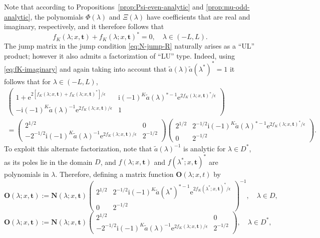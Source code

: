 \documentclass[12pt]{amsart}
\numberwithin{equation}{section}
\newcommand{\ee}{\mathrm{e}}
\newcommand{\ii}{\mathrm{i}}
\newcommand{\SP}{\lambda}
\newcommand{\phaseint}{\Phi}
\newcommand{\tailint}{\Xi}
\begin{document}
Note that according to Propositions~\ref{prop:Psi-even-analytic} and \ref{prop:mu-odd-analytic}, the polynomials $\phaseint(\SP)$ and $\tailint(\SP)$ have coefficients that are real and imaginary, respectively, and it therefore follows that
\begin{equation}
f_K(\SP;x,\mathbf{t})+f_K(\SP;x,\mathbf{t})^*=0,\quad\SP\in (-L,L).
\label{eq:fK-imaginary}
\end{equation}
The jump matrix in the jump condition \eqref{eq:N-jump-R} naturally arises as a ``UL'' product; however it also admits a factorization of ``LU'' type.  Indeed, using \eqref{eq:fK-imaginary} and again taking into account that $\widetilde{a}(\SP)\widetilde{a}(\SP^*)^*=1$ it follows that for $\SP\in (-L,L)$,
\begin{multline}
\begin{pmatrix} 1+\ee^{2[f_K(\SP;x,\mathbf{t})+f_K(\SP;x,\mathbf{t})^*]/\epsilon} & \ii(-1)^K\widetilde{a}(\SP)^{*-1}\ee^{2f_K(\SP;x,\mathbf{t})^*/\epsilon}\\-\ii(-1)^K\widetilde{a}(\SP)^{-1}\ee^{2f_K(\SP;x,\mathbf{t})/\epsilon} & 1\end{pmatrix}\\{}=\begin{pmatrix}2^{1/2} & 0\\-2^{-1/2}\ii(-1)^K\widetilde{a}(\SP)^{-1}\ee^{2f_K(\SP;x,\mathbf{t})/\epsilon} & 2^{-1/2}\end{pmatrix}\begin{pmatrix}2^{1/2} & 2^{-1/2}\ii (-1)^K\widetilde{a}(\SP)^{*-1}\ee^{2f_K(\SP;x,\mathbf{t})^*/\epsilon}\\0 & 2^{-1/2}\end{pmatrix}.
\label{eq:N-jump-R-refactor}
\end{multline}
To exploit this alternate factorization, note that $\widetilde{a}(\SP)^{-1}$ is analytic for $\SP\in D^*$, as its poles lie in the domain $D$, and $f(\SP;x,\mathbf{t})$ and $f(\SP^*;x,\mathbf{t})^*$ are polynomials in $\SP$.  Therefore, defining a matrix function $\mathbf{O}(\SP;x,t)$ by 
\begin{equation}
\mathbf{O}(\SP;x,\mathbf{t}):=\mathbf{N}(\SP;x,\mathbf{t})\begin{pmatrix}2^{1/2} & 2^{-1/2}\ii (-1)^K\widetilde{a}(\SP^*)^{*-1}\ee^{2f_K(\SP^*;x,\mathbf{t})^*/\epsilon}\\0 & 2^{-1/2}\end{pmatrix}^{-1},\quad\SP\in D,
\end{equation}
\begin{equation}
\mathbf{O}(\SP;x,\mathbf{t}):=\mathbf{N}(\SP;x,\mathbf{t})\begin{pmatrix}2^{1/2} & 0\\-2^{-1/2}\ii(-1)^K\widetilde{a}(\SP)^{-1}\ee^{2f_K(\SP;x,\mathbf{t})/\epsilon} & 2^{-1/2}\end{pmatrix},\quad\SP\in D^*,
\end{equation}
\end{document}
